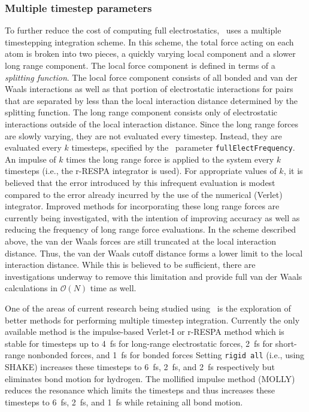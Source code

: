 \subsubsection{Multiple timestep parameters}
\label{section:mts}

To further reduce the cost of computing full electrostatics, 
\NAMD\ uses a multiple timestepping integration scheme.  In this scheme, 
the total force acting on each atom is broken into two pieces, a quickly varying local 
component and a slower long range component.  
The local force component is defined in terms of a {\it splitting function}.  The local force component consists of all bonded and van der Waals interactions
as well as that portion of electrostatic interactions for pairs that are separated by less than the local interaction distance determined by the splitting function.  
The long range component consists only of 
electrostatic interactions outside of the local interaction distance.
Since the long range forces are slowly varying, they are not evaluated
every timestep.  Instead, they are evaluated every $k$ timesteps,
specified by the \NAMD\ parameter {\tt fullElectFrequency}.  
An impulse of $k$ times the long range force is applied to the system
every $k$ timesteps (i.e., the r-RESPA integrator is used).
For appropriate values of $k$,
it is believed that the error introduced by this infrequent evaluation
is modest compared to the error already incurred by the use of the numerical
(Verlet) integrator.  
Improved methods for incorporating these long range forces
are currently being investigated, 
with the intention of improving accuracy as well as 
reducing the frequency of long range force evaluations.  
\prettypar
In the scheme described above, the van der Waals forces are still 
truncated at the local interaction distance.  
Thus, the van der Waals cutoff distance 
forms a lower limit to the local interaction distance.  While this is
believed to be sufficient, there are investigations underway to remove
this limitation and provide full van der Waals calculations in 
${\mathcal O}(N)$ time as well.  

One of the areas of current research being studied using \NAMD\ is the
exploration of better methods for performing multiple timestep integration.
Currently the only available method is the impulse-based Verlet-I or r-RESPA
method which is stable for timesteps up to 4~fs for long-range electrostatic
forces, 2~fs for short-range nonbonded forces, and 1~fs for bonded forces
Setting {\tt rigid all} (i.e., using SHAKE) increases these timesteps to
6~fs, 2~fs, and 2~fs respectively but eliminates bond motion for hydrogen.
The mollified impulse method (MOLLY) reduces the resonance which limits
the timesteps and thus increases these timesteps to 6~fs, 2~fs, and 1~fs
while retaining all bond motion.

